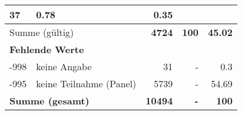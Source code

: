 \begin{longtable}{lXrrr}
       \num{37} &
       \num[round-mode=places,round-precision=2]{0.78} &
         \num[round-mode=places,round-precision=2]{0.35} \\
     \midrule
     \multicolumn{2}{l}{Summe (gültig)} &
       \textbf{\num{4724}} &
     \textbf{\num{100}} &
       \textbf{\num[round-mode=places,round-precision=2]{45.02}} \\
     \multicolumn{5}{l}{\textbf{Fehlende Werte}}\\
       -998 &
       keine Angabe &
         \num{31} &
        - &
         \num[round-mode=places,round-precision=2]{0.3} \\
       -995 &
       keine Teilnahme (Panel) &
         \num{5739} &
        - &
         \num[round-mode=places,round-precision=2]{54.69} \\
     \midrule
     \multicolumn{2}{l}{\textbf{Summe (gesamt)}} &
          \textbf{\num{10494}} &
        \textbf{-} &
        \textbf{\num{100}} \\
     \bottomrule
     \end{longtable}
     
